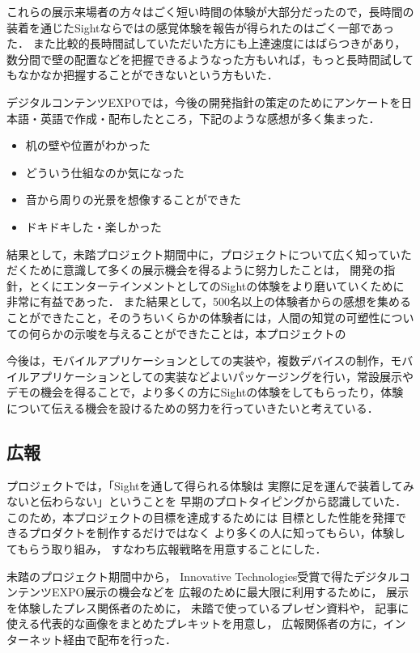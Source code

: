 これらの展示来場者の方々はごく短い時間の体験が大部分だったので，長時間の装着を通じたSightならではの感覚体験を報告が得られたのはごく一部であった．
また比較的長時間試していただいた方にも上達速度にはばらつきがあり，
数分間で壁の配置などを把握できるようなった方もいれば，もっと長時間試してもなかなか把握することができないという方もいた．

デジタルコンテンツEXPOでは，今後の開発指針の策定のためにアンケートを日本語・英語で作成・配布したところ，下記のような感想が多く集まった．

\begin{itemize}
 \item 机の壁や位置がわかった
 \item どういう仕組なのか気になった
 \item 音から周りの光景を想像することができた
 \item ドキドキした・楽しかった
\end{itemize}

結果として，未踏プロジェクト期間中に，プロジェクトについて広く知っていただくために意識して多くの展示機会を得るように努力したことは，
開発の指針，とくにエンターテインメントとしてのSightの体験をより磨いていくために非常に有益であった．
また結果として，500名以上の体験者からの感想を集めることができたこと，そのうちいくらかの体験者には，人間の知覚の可塑性についての何らかの示唆を与えることができたことは，本プロジェクトの

今後は，モバイルアプリケーションとしての実装や，複数デバイスの制作，モバイルアプリケーションとしての実装などよいパッケージングを行い，常設展示やデモの機会を得ることで，より多くの方にSightの体験をしてもらったり，体験について伝える機会を設けるための努力を行っていきたいと考えている．


\subsection{広報}

プロジェクトでは，「Sightを通して得られる体験は
実際に足を運んで装着してみないと伝わらない」ということを
早期のプロトタイピングから認識していた．
このため，本プロジェクトの目標を達成するためには
目標とした性能を発揮できるプロダクトを制作するだけではなく
より多くの人に知ってもらい，体験してもらう取り組み，
すなわち広報戦略を用意することにした．

未踏のプロジェクト期間中から，
Innovative Technologies受賞で得たデジタルコンテンツEXPO展示の機会などを
広報のために最大限に利用するために，
展示を体験したプレス関係者のために，
未踏で使っているプレゼン資料や，
記事に使える代表的な画像をまとめたプレキットを用意し，
広報関係者の方に，インターネット経由で配布を行った．

